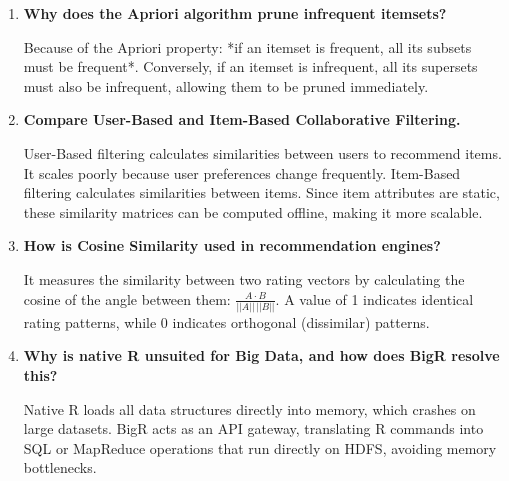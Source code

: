 \documentclass[12pt,a4paper]{article}
\newcommand{\Q}[1]{\textbf{#1}\par\noindent\ignorespaces}
\begin{document}
\begin{tcolorbox}[exambox, title={\textbf{Frequently Asked / Viva Questions}}]
\begin{enumerate}[leftmargin=*, topsep=0pt, label=\textbf{Q\arabic*.}, itemsep=5pt]
  \item \Q{Why does the Apriori algorithm prune infrequent itemsets?}
        Because of the Apriori property: *if an itemset is frequent, all its subsets must be frequent*. Conversely, if an itemset is infrequent, all its supersets must also be infrequent, allowing them to be pruned immediately.
        
  \item \Q{Compare User-Based and Item-Based Collaborative Filtering.}
        User-Based filtering calculates similarities between users to recommend items. It scales poorly because user preferences change frequently. Item-Based filtering calculates similarities between items. Since item attributes are static, these similarity matrices can be computed offline, making it more scalable.
        
  \item \Q{How is Cosine Similarity used in recommendation engines?}
        It measures the similarity between two rating vectors by calculating the cosine of the angle between them: $\frac{A \cdot B}{||A|| \, ||B||}$. A value of 1 indicates identical rating patterns, while 0 indicates orthogonal (dissimilar) patterns.
        
  \item \Q{Why is native R unsuited for Big Data, and how does BigR resolve this?}
        Native R loads all data structures directly into memory, which crashes on large datasets. BigR acts as an API gateway, translating R commands into SQL or MapReduce operations that run directly on HDFS, avoiding memory bottlenecks.
\end{enumerate}
\end{tcolorbox}

\vspace{6pt}
\end{document}
